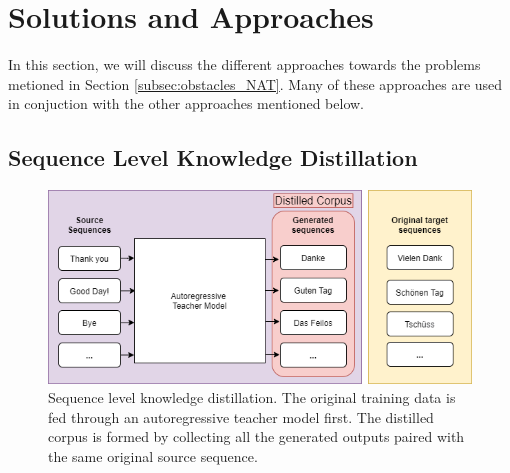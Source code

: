 \section{Solutions and Approaches} \label{sec:solutions}

In this section, we will discuss the different approaches towards the problems metioned in Section \ref{subsec:obstacles_NAT}. Many of these approaches are used in conjuction with the other approaches mentioned below.

\subsection{Sequence Level Knowledge Distillation}
\label{subsec:sol1_slkd}
\begin{figure}[h!]
    \centering
    \includegraphics[width=\textwidth]{images/chap02_images/seq_level_kd.png}
    \caption{Sequence level knowledge distillation. The original training data is fed through an autoregressive teacher model first. The distilled corpus is formed by collecting all the generated outputs paired with the same original source sequence.}
    \label{fig:slkd}
\end{figure}


